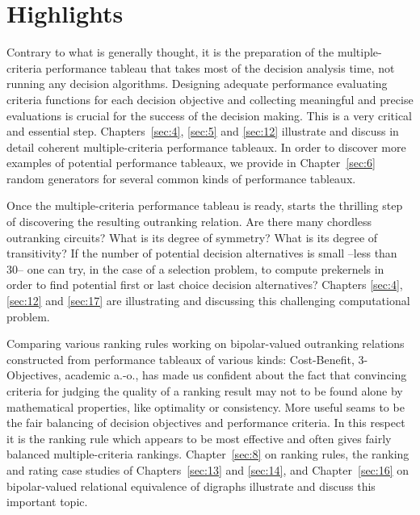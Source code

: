 {}
\section*{Highlights}
\label{sec:0.3}

Contrary to what is generally thought, it is the preparation of the multiple-criteria performance tableau that takes most of the decision analysis time, not running any decision algorithms. Designing adequate performance evaluating criteria functions for each decision objective and collecting meaningful and precise evaluations is crucial for the success of the decision making. This is a very critical and essential step. Chapters~\ref{sec:4}, \ref{sec:5} and \ref{sec:12} illustrate and discuss in detail coherent multiple-criteria performance tableaux. In order to discover more examples of potential performance tableaux, we provide in Chapter~\ref{sec:6} random generators for several common kinds of performance tableaux. 

Once the multiple-criteria performance tableau is ready, starts the thrilling step of discovering the resulting outranking relation. Are there many chordless outranking circuits? What is its degree of symmetry? What is its degree of transitivity?  If the number of potential decision alternatives is small --less than 30-- one can try, in the case of a selection problem, to compute prekernels in order to find potential first or last choice decision alternatives? Chapters \ref{sec:4}, \ref{sec:12} and \ref{sec:17} are illustrating and discussing this challenging computational problem.

Comparing various ranking rules working on bipolar-valued outranking relations constructed from performance tableaux of various kinds: Cost-Benefit, 3-Objectives, academic a.-o., has made us confident about the fact that convincing criteria for judging the quality of a ranking result may not to be found alone by mathematical properties, like \Kemeny optimality or \Condorcet consistency. More useful seams to be the fair balancing of decision objectives and performance criteria. In this respect it is the \NetFlows ranking rule which appears to be most effective and often gives fairly balanced multiple-criteria rankings. Chapter~\ref{sec:8} on ranking rules, the ranking and rating case studies of Chapters~\ref{sec:13} and \ref{sec:14}, and Chapter~\ref{sec:16} on bipolar-valued relational equivalence of digraphs illustrate and discuss this important topic.

